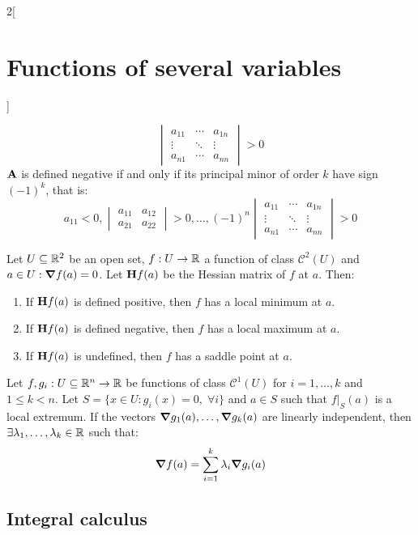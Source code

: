 \documentclass[../../../main_math.tex]{subfiles}
\begin{document}
\begin{multicols}{2}[\section{Functions of several variables}]
\begin{proposition}
$$\begin{vmatrix}
        a_{11} & \cdots & a_{1n} \\
        \vdots & \ddots & \vdots \\
        a_{n1} & \cdots & a_{nn}
      \end{vmatrix}>0$$
    $\boldsymbol{\mathrm{A}}$ is defined negative if and only if its principal minor of order $k$ have sign $(-1)^k$, that is:
    $$a_{11}<0,
      \begin{vmatrix}
        a_{11} & a_{12} \\
        a_{21} & a_{22}
      \end{vmatrix}>0,\ldots,
      (-1)^n\begin{vmatrix}
        a_{11} & \cdots & a_{1n} \\
        \vdots & \ddots & \vdots \\
        a_{n1} & \cdots & a_{nn}
      \end{vmatrix}>0$$
  \end{proposition}
  \begin{theorem}
    Let $U\subseteq\mathbb{R}^2$ be an open set, $f:U\rightarrow\mathbb{R} $ a function of class $\mathcal{C}^2(U)$ and $a\in U:\grad f(a)=0$. Let $\boldsymbol{\mathrm{H}}f(a)$ be the Hessian matrix of $f$ at $a$. Then:
    \begin{enumerate}
      \item If $\boldsymbol{\mathrm{H}}f(a)$ is defined positive, then $f$ has a local minimum at $a$.
      \item If $\boldsymbol{\mathrm{H}}f(a)$ is defined negative, then $f$ has a local maximum at $a$.
      \item If $\boldsymbol{\mathrm{H}}f(a)$ is undefined, then $f$ has a saddle point at $a$.
    \end{enumerate}
  \end{theorem}
  \begin{theorem}
    Let $f,g_i:U\subseteq\mathbb{R}^n\rightarrow\mathbb{R} $ be functions of class $\mathcal{C}^1(U)$ for $i=1,\ldots,k$ and $1\leq k<n$. Let $S=\{x\in U:g_i(x)=0,\;\forall i\}$ and $a\in S$ such that $f|_S(a)$ is a local extremum. If the vectors $\grad g_1(a),\ldots,\grad g_k(a)$ are linearly independent, then $\exists\lambda_1,\ldots,\lambda_k\in\mathbb{R} $ such that: $$\grad f(a)=\sum_{i=1}^k\lambda_i\grad g_i(a)$$
  \end{theorem}
  \subsection{Integral calculus}

\end{multicols}
\end{document}
